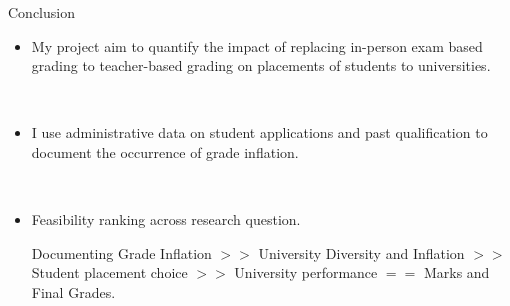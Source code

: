 \begin{frame}{Conclusion}
    \begin{itemize}
    \item My project aim to quantify the impact of replacing in-person exam based grading to teacher-based grading on placements of students to universities. 

    \

    \item I use administrative data on student applications and past qualification to document the occurrence of grade inflation.
    
    \
    
    \item Feasibility ranking across research question.

    Documenting Grade Inflation $>>$ University Diversity and Inflation $>>$ Student placement choice $>>$  University performance $==$ Marks and Final Grades.
    \end{itemize}
\end{frame}